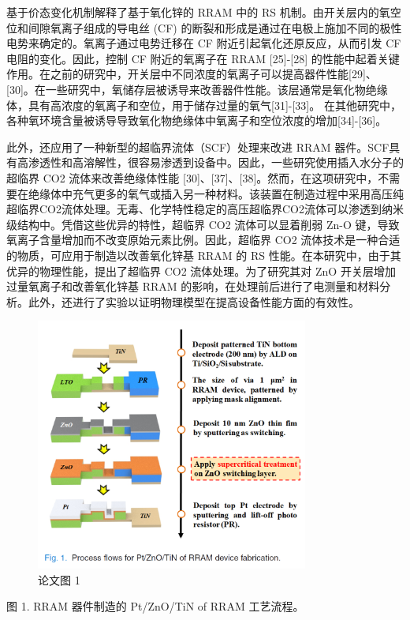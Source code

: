 基于价态变化机制解释了基于氧化锌的 RRAM 中的 RS 机制。由开关层内的氧空位和间隙氧离子组成的导电丝 (CF) 的断裂和形成是通过在电极上施加不同的极性电势来确定的。氧离子通过电势迁移在 CF 附近引起氧化还原反应，从而引发 CF 电阻的变化。因此，控制 CF 附近的氧离子在 RRAM [25]-[28] 的性能中起着关键作用。在之前的研究中，开关层中不同浓度的氧离子可以提高器件性能[29]、[30]。在一些研究中，氧储存层被诱导来改善器件性能。该层通常是氧化物绝缘体，具有高浓度的氧离子和空位，用于储存过量的氧气[31]-[33]。
在其他研究中，各种氧环境含量被诱导导致氧化物绝缘体中氧离子和空位浓度的增加[34]-[36]。

此外，还应用了一种新型的超临界流体（SCF）处理来改进 RRAM 器件。SCF具有高渗透性和高溶解性，很容易渗透到设备中。因此，一些研究使用插入水分子的超临界 CO2 流体来改善绝缘体性能 [30]、[37]、[38]。然而，在这项研究中，不需要在绝缘体中充气更多的氧气或插入另一种材料。该装置在制造过程中采用高压纯超临界CO2流体处理。无毒、化学特性稳定的高压超临界CO2流体可以渗透到纳米级结构中。凭借这些优异的特性，超临界 CO2 流体可以显着削弱 Zn-O 键，导致氧离子含量增加而不改变原始元素比例。因此，超临界 CO2 流体技术是一种合适的物质，可应用于制造以改善氧化锌基 RRAM 的 RS 性能。在本研究中，由于其优异的物理性能，提出了超临界 CO2 流体处理。为了研究其对 ZnO 开关层增加过量氧离子和改善氧化锌基 RRAM 的影响，在处理前后进行了电测量和材料分析。此外，还进行了实验以证明物理模型在提高设备性能方面的有效性。


\begin{figure}[htb]
\centering 
\includegraphics[width=0.80\textwidth]{img/c1m1.png} 
\caption{论文图 1}
\label{Test}
\end{figure}

图 1. RRAM 器件制造的 Pt/ZnO/TiN of RRAM 工艺流程。

